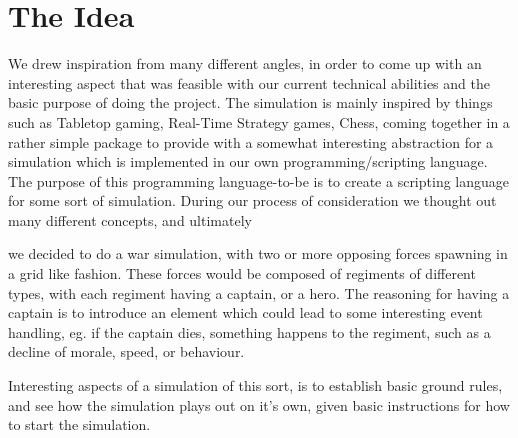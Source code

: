 \section{The Idea}
	We drew inspiration from many different angles, in order to come up with an interesting aspect that was feasible with our current technical abilities and the basic purpose of doing the project.
	The simulation is mainly inspired by things such as Tabletop gaming, Real-Time Strategy games, Chess, coming together in a rather simple package to provide with a somewhat interesting abstraction for a simulation which is implemented in our own programming/scripting language.
	The purpose of this programming language-to-be 
	is to create a scripting language for some sort of simulation. 
	During our process of consideration we thought out many different concepts, 
	and ultimately 
	\begin{comment}we came to a decision that it would be more interesting to 
	have a controlled environment with a lot of units participating. Reasons for 
	this is that the simulation would not be very interesting to perform when dealing with minor numbers, 
	the reasoning behind this is that we do not expect to make a very complicated simulation, therefore dealing in larger numbers proved 
	more interesting to us. \newline
	
	Ultimately\end{comment}
	we decided to do a war simulation, with two or more opposing forces 
	spawning in a grid like fashion. These forces would be composed of regiments of 
	different types, with each regiment having a captain, or a hero. The reasoning for having a 
	captain is to introduce an element which could lead to some interesting event handling, 
	eg. if the captain dies, something happens to the regiment, such as a decline of morale, speed, or behaviour. \newline
	
	Interesting aspects of a simulation of this sort, is to establish basic ground rules, 
	and see how the simulation plays out on it's own, given basic instructions for how to start the simulation.